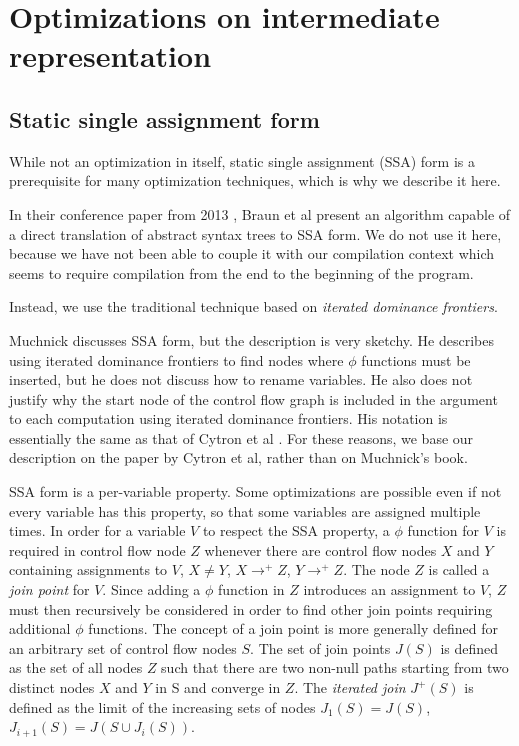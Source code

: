 \chapter{Optimizations on intermediate representation}

\section{Static single assignment form}

While not an optimization in itself, static single assignment (SSA)
form is a prerequisite for many optimization techniques, which is why
we describe it here. 

In their conference paper from 2013
\cite{Braun:2013:SEC:2450247.2450258}, Braun et al present an
algorithm capable of a direct translation of abstract syntax trees to
SSA form.  We do not use it here, because we have not been able to
couple it with our compilation context which seems to require
compilation from the end to the beginning of the program. 

Instead, we use the traditional technique based on \emph{iterated
  dominance frontiers}.

Muchnick \cite{Muchnick:1998:ACD:286076} discusses SSA form, but the
description is very sketchy.  He describes using iterated dominance
frontiers to find nodes where $\phi$ functions must be inserted, but
he does not discuss how to rename variables.  He also does not justify
why the start node of the control flow graph is included in the
argument to each computation using iterated dominance frontiers.  His
notation is essentially the same as that of Cytron et al
\cite{Cytron:1991:ECS:115372.115320}.  For these reasons, we base our
description on the paper by Cytron et al, rather than on Muchnick's
book.

SSA form is a per-variable property.  Some optimizations are possible
even if not every variable has this property, so that some variables
are assigned multiple times.  In order for a variable $V$ to respect
the SSA property, a $\phi$ function for $V$ is required in control
flow node $Z$ whenever there are control flow nodes $X$ and $Y$
containing assignments to $V$, $X \ne Y$, $X \rightarrow^+ Z$, $Y
\rightarrow^+ Z$.  The node $Z$ is called a \emph{join point} for $V$.
Since adding a $\phi$ function in $Z$ introduces an assignment to $V$,
$Z$ must then recursively be considered in order to find other join
points requiring additional $\phi$ functions.  The concept of a join
point is more generally defined for an arbitrary set of control flow
nodes $S$.  The set of join points $J(S)$ is defined as the set of all
nodes $Z$ such that there are two non-null paths starting from two
distinct nodes $X$ and $Y$ in S and converge in $Z$.  The
\emph{iterated join} $J^+(S)$ is defined as the limit of the
increasing sets of nodes $J_1(S) = J(S)$, $J_{i+1}(S) = J(S \cup
J_i(S))$.

